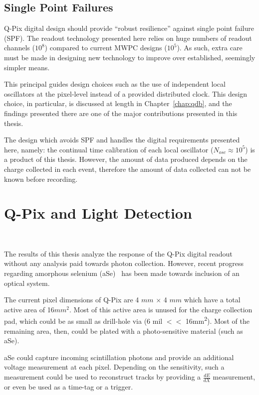 \subsection{Single Point Failures}

Q-Pix digital design should provide  ``robust resilience'' against single point failure (SPF).
The readout technology presented here relies on huge numbers of readout channels ($10^{8}$) compared to current MWPC designs ($10^{5}$).
As such, extra care must be made in designing new technology to improve over established, seemingly simpler means.

This principal guides design choices such as the use of independent local oscillators at the pixel-level instead of a provided distributed clock.
This design choice, in particular, is discussed at length in Chapter~\ref{chap:qdb}, and the findings presented there are one of the major contributions presented in this thesis.

The design which avoids SPF and handles the digital requirements presented here, namely: the continual time calibration of each local oscillator ($N_{osc} \approx 10^{5}$) is a product of this thesis.
However, the amount of data produced depends on the charge collected in each event, therefore the amount of data collected can not be known before recording.

\section{Q-Pix and Light Detection}~\label{sec:qpix_photonics}

The results of this thesis analyze the response of the Q-Pix digital readout without any analysis paid towards photon collection.
However, recent progress regarding amorphous selenium (aSe)~\citep{https://doi.org/10.48550/arxiv.2207.11127} has been made towards inclusion of an optical system.

The current pixel dimensions of Q-Pix are 4 $\unit{mm}$ $\times$ 4 $\unit{mm} $ which have a total active area of 16$\unit{mm^{2}}$.
Most of this active area is unused for the charge collection pad, which could be as small as drill-hole via (6 mil $<<$ 16\unit{mm^2}).
Most of the remaining area, then, could be plated with a photo-sensitive material (such as aSe).

aSe could capture incoming scintillation photons and provide an additional voltage measurement at each pixel.
Depending on the sensitivity, such a measurement could be used to reconstruct tracks by providing a $\frac{dE}{dX}$ measurement, or even be used as a time-tag or a trigger.

